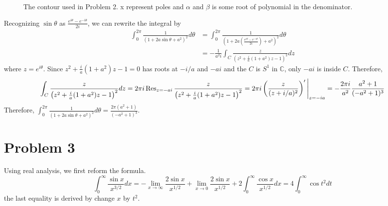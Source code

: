 \documentclass{article}
\begin{document}
\begin{figure}[h]
\centering
{}
\caption{The contour used in Problem 2. x represent poles and $\alpha$ and $\beta$ is some root of polynomial in the denominator.}
\label{Fig:P2}
\end{figure}
Recognizing $\sin\theta$ as $\frac{e^{i\theta}-e^{-i\theta}}{2i}$, we can rewrite the integral by
\begin{equation*}
\begin{split}
\int_0^{2\pi} \frac{1}{(1+2a\sin\theta+a^2)^2}d\theta&=\int_0^{2\pi} \frac{1}{\left(1+2a\left(\frac{e^{i\theta}-e^{-i\theta}}{2i}\right)+a^2\right)^2}d\theta\\
&=-\frac{1}{a^2i}\int_{C} \frac{z}{\left(z^2+\frac{i}{a}(1+a^2)z-1\right)^2}dz
\end{split}
\end{equation*}
where $z=e^{i\theta}$. Since $z^2+\frac{i}{a}(1+a^2)z-1=0$ has roots at $-i/a$ and $-ai$ and the $C$ is $S^1$ in $\mathbb{C}$, only $-ai$ is inside $C$. Therefore, 
\begin{equation*}
\int_{C} \frac{z}{\left(z^2+\frac{i}{a}(1+a^2)z-1\right)^2}dz=2\pi i\Res_{z=-ai}\frac{z}{\left(z^2+\frac{i}{a}(1+a^2)z-1\right)^2}=2\pi i\left(\frac{z}{(z+i/a)^2}\right)'\Bigg{|}_{z=-ia}=-\frac{2\pi i}{a^2}\frac{a^2+1}{(-a^2+1)^3}
\end{equation*}
Therefore, $\int_0^{2\pi} \frac{1}{(1+2a\sin\theta+a^2)^2}d\theta=\frac{2\pi(a^2+1)}{(-a^2+1)^3}$.

\section*{Problem 3}
Using real analysis, we first reform the formula.
\begin{equation*}
\int_0^\infty \frac{\sin{x}}{x^{3/2}}dx=-\lim\limits_{x\rightarrow \infty} \frac{2\sin{x}}{x^{1/2}} + \lim\limits_{x\rightarrow 0} \frac{2\sin{x}}{x^{1/2}} + 2\int_0^\infty \frac{\cos{x}}{x^{1/2}}dx=4\int_0^\infty \cos{t^2} dt
\end{equation*}
the last equality is derived by change $x$ by $t^2$.
\end{document}

